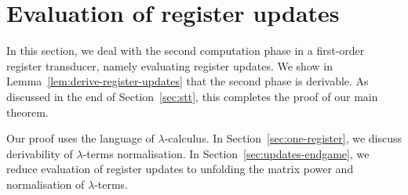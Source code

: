 
\section{Evaluation of register updates}
\label{sec:stt-derivable}
In this section, we deal with the second computation phase in a first-order register transducer, namely evaluating register updates. We show in Lemma~\ref{lem:derive-register-updates} that the second phase is derivable. As  discussed in the end of Section~\ref{sec:stt}, this completes the proof of our main theorem. 



Our proof uses the language of $\lambda$-calculus.  In Section~\ref{sec:one-register},  we discuss derivability of $\lambda$-terms normalisation. In Section~\ref{sec:updates-endgame}, we reduce evaluation of register updates to  unfolding the matrix power  and normalisation of $\lambda$-terms.  


%



  
